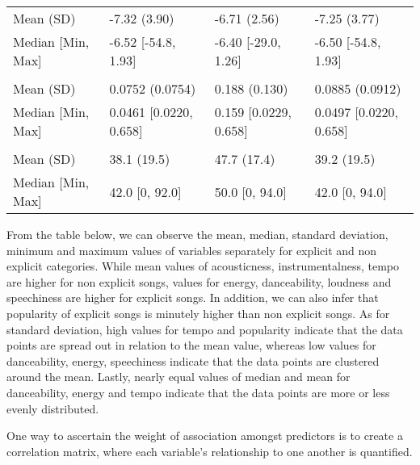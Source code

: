 \documentclass[
]{article}
\begin{document}
\begin{tabular}[t]{llll}
\hspace{1em}Mean (SD) & -7.32 (3.90) & -6.71 (2.56) & -7.25 (3.77)\\
\hspace{1em}Median [Min, Max] & -6.52 [-54.8, 1.93] & -6.40 [-29.0, 1.26] & -6.50 [-54.8, 1.93]\\
\addlinespace[0.3em]
\multicolumn{4}{l}{\textbf{speechiness}}\\
\hspace{1em}Mean (SD) & 0.0752 (0.0754) & 0.188 (0.130) & 0.0885 (0.0912)\\
\hspace{1em}Median [Min, Max] & 0.0461 [0.0220, 0.658] & 0.159 [0.0229, 0.658] & 0.0497 [0.0220, 0.658]\\
\addlinespace[0.3em]
\multicolumn{4}{l}{\textbf{popularity}}\\
\hspace{1em}Mean (SD) & 38.1 (19.5) & 47.7 (17.4) & 39.2 (19.5)\\
\hspace{1em}Median [Min, Max] & 42.0 [0, 92.0] & 50.0 [0, 94.0] & 42.0 [0, 94.0]\\
\bottomrule
\end{tabular}

From the table below, we can observe the mean, median, standard
deviation, minimum and maximum values of variables separately for
explicit and non explicit categories. While mean values of acousticness,
instrumentalness, tempo are higher for non explicit songs, values for
energy, danceability, loudness and speechiness are higher for explicit
songs. In addition, we can also infer that popularity of explicit songs
is minutely higher than non explicit songs. As for standard deviation,
high values for tempo and popularity indicate that the data points are
spread out in relation to the mean value, whereas low values for
danceability, energy, speechiness indicate that the data points are
clustered around the mean. Lastly, nearly equal values of median and
mean for danceability, energy and tempo indicate that the data points
are more or less evenly distributed.

One way to ascertain the weight of association amongst predictors is to
create a correlation matrix, where each variable's relationship to one
another is quantified.
\end{document}
